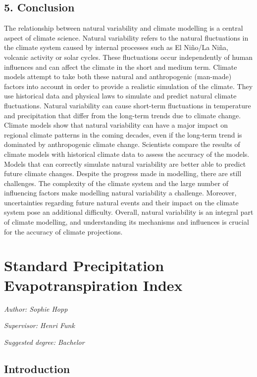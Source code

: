 \documentclass[
]{krantz}
\begin{document}
\section{5. Conclusion}\label{conclusion}

The relationship between natural variability and climate modelling is a central aspect of climate science. Natural variability refers to the natural fluctuations in the climate system caused by internal processes such as El Niño/La Niña, volcanic activity or solar cycles. These fluctuations occur independently of human influences and can affect the climate in the short and medium term. Climate models attempt to take both these natural and anthropogenic (man-made) factors into account in order to provide a realistic simulation of the climate. They use historical data and physical laws to simulate and predict natural climate fluctuations.
Natural variability can cause short-term fluctuations in temperature and precipitation that differ from the long-term trends due to climate change. Climate models show that natural variability can have a major impact on regional climate patterns in the coming decades, even if the long-term trend is dominated by anthropogenic climate change. Scientists compare the results of climate models with historical climate data to assess the accuracy of the models. Models that can correctly simulate natural variability are better able to predict future climate changes.
Despite the progress made in modelling, there are still challenges. The complexity of the climate system and the large number of influencing factors make modelling natural variability a challenge. Moreover, uncertainties regarding future natural events and their impact on the climate system pose an additional difficulty. Overall, natural variability is an integral part of climate modelling, and understanding its mechanisms and influences is crucial for the accuracy of climate projections.

\chapter{Standard Precipitation Evapotranspiration Index}\label{spei}

\emph{Author: Sophie Hopp}

\emph{Supervisor: Henri Funk}

\emph{Suggested degree: Bachelor}

\section{Introduction}\label{introduction-1}
\end{document}
